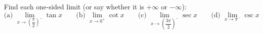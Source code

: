 Find each one-sided limit (or say whether it is $+\infty$ or $-\infty$):
\[\text{(a) }\lim_{x\to\left(\dfrac\pi2\right)^-}\tan x\qquad\text{(b) }\lim_{x\to0^+}\cot x\qquad\text{(c) }\lim_{x\to\left(\dfrac{3\pi}2\right)^-}\sec x\qquad\text{(d) }\lim_{x\to\pi^-}\csc x\]
